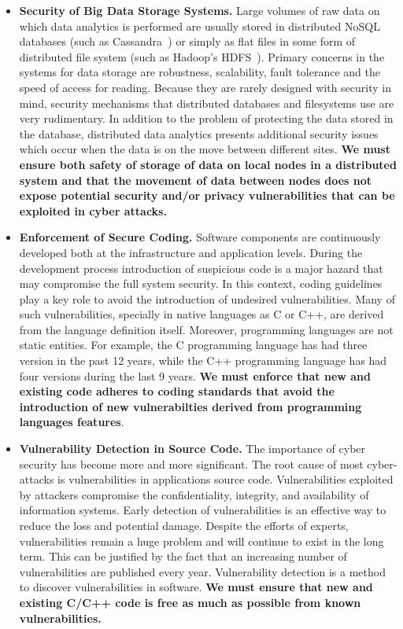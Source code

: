 \documentclass[a4paper,11pt]{article}
\begin{document}
\begin{itemize}
\item \textbf{Security of Big Data Storage Systems.} Large volumes of raw data on which data analytics is performed are usually stored in distributed NoSQL databases (such as Cassandra~\cite{cassandra}) or simply as flat files in some form of distributed file system (such as Hadoop's HDFS~\cite{hdfs}). Primary concerns in the systems for data storage are robustness, scalability, fault tolerance and the speed of access for reading. Because they are rarely designed with security in mind, security mechanisms that distributed databases and filesystems use are very rudimentary. In addition to the problem of protecting the data stored in the database, distributed data analytics presents additional security issues which occur when the data is on the move between different sites. \textbf{We must ensure both safety of storage of data on local nodes in a distributed system and that the movement of data between nodes does not expose potential security and/or privacy vulnerabilities that can be exploited in cyber attacks.}

\item \textbf{Enforcement of Secure Coding.} Software components are continuously developed both at the infrastructure and application levels. During the development process introduction of suspicious code is a major hazard that may compromise the full system security. In this context, coding guidelines play a key role to avoid the introduction of undesired vulnerabilities. Many of such vulnerabilities, specially in native languages as C or C++, are derived from the language definition itself. Moreover, programming languages are not static entities. For example, the C programming language has had three version in the past 12 years, while the C++ programming language has had four versions during the last 9 years. \textbf{We must enforce that new and existing code adheres to coding standards that avoid the introduction of new vulnerabilties derived from programming languages features}. 

\item \textbf{Vulnerability Detection in Source Code.} The importance of cyber security has become more and more signiﬁcant. The root cause of most cyber-attacks is vulnerabilities in applications source code. Vulnerabilities exploited by attackers compromise the conﬁdentiality, integrity, and availability of information systems. Early detection of vulnerabilities is an eﬀective way to reduce the loss and potential damage. Despite the eﬀorts of experts, vulnerabilities remain a huge problem and will continue to exist in the long term. This can be justiﬁed by the fact that an increasing number of vulnerabilities are published every year. Vulnerability detection is a method to discover vulnerabilities in software. \textbf{We must ensure that new and existing C/C++ code is free as much as possible from known vulnerabilities.}


\end{itemize}
\end{document}
